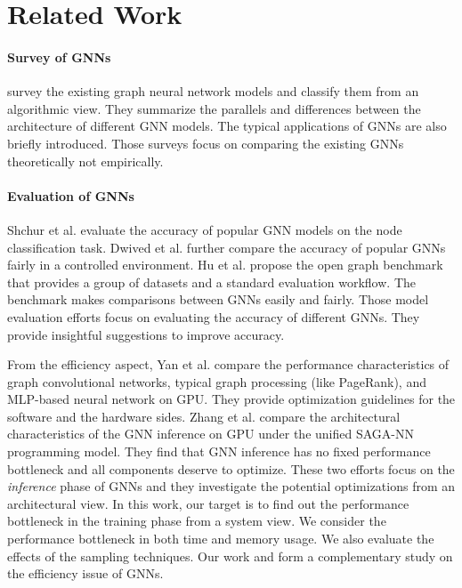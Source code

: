 \section{Related Work}
\label{sec:related_work}

\paragraph{Survey of GNNs}
\cite{zhou2018_gnn_review,zhang2018_gnn_survey,comprehensive-survey-wu-2020} survey the existing graph neural network models and classify them from an algorithmic view.
They summarize the parallels and differences between the architecture of different GNN models.
The typical applications of GNNs are also briefly introduced.
Those surveys focus on comparing the existing GNNs theoretically not empirically.

\paragraph{Evaluation of GNNs}
Shchur et al. \cite{shchur2018_pitfall_of_gnn} evaluate the accuracy of popular GNN models on the node classification task.
Dwived et al. \cite{dwivedi2020_benchmark_of_gnn} further compare the accuracy of popular GNNs fairly in a controlled environment.
Hu et al. \cite{hu2020_open_graph_benchmark} propose the open graph benchmark that provides a group of datasets and a standard evaluation workflow.
The benchmark makes comparisons between GNNs easily and fairly.
Those model evaluation efforts focus on evaluating the accuracy of different GNNs.
They provide insightful suggestions to improve accuracy.

From the efficiency aspect, Yan et al. \cite{yan2020_characterizing_gcn} compare the performance characteristics of graph convolutional networks, typical graph processing (like PageRank), and MLP-based neural network on GPU.
They provide optimization guidelines for the software and the hardware sides.
Zhang et al. \cite{zhang2020_analysis_neugraph} compare the architectural characteristics of the GNN inference on GPU under the unified SAGA-NN \cite{ma2019_neugraph} programming model.
They find that GNN inference has no fixed performance bottleneck and all components deserve to optimize.
These two efforts focus on the \emph{inference} phase of GNNs and they investigate the potential optimizations from an architectural view.
In this work, our target is to find out the performance bottleneck in the training phase from a system view.
We consider the performance bottleneck in both time and memory usage.
We also evaluate the effects of the sampling techniques.
Our work and \cite{yan2020_characterizing_gcn, zhang2020_analysis_neugraph} form a complementary study on the efficiency issue of GNNs.

